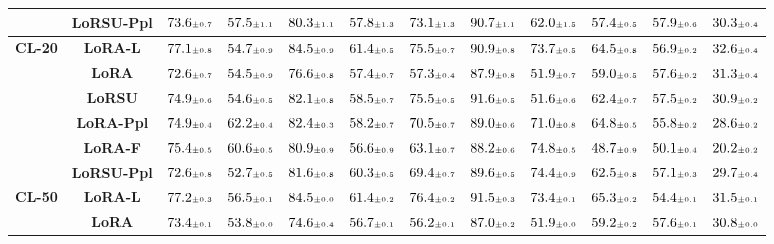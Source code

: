 \begin{table}
\begin{center}
\begin{small}
\begin{tabular}{l c c c c c c c c c c c}
& \textbf{LoRSU-Ppl} & $73.6 \mtiny{\pm 0.7}$ & $57.5 \mtiny{\pm 1.1}$ & $80.3 \mtiny{\pm 1.1}$ & $57.8 \mtiny{\pm 1.3}$ & $73.1 \mtiny{\pm 1.3}$ & $90.7 \mtiny{\pm 1.1}$ & $62.0 \mtiny{\pm 1.5}$ & $57.4 \mtiny{\pm 0.5}$ & $57.9 \mtiny{\pm 0.6}$ & $30.3 \mtiny{\pm 0.4}$ \\
\midrule
\multirow{6}{*}{\textbf{CL-20}} & \textbf{LoRA-L} & $77.1 \mtiny{\pm 0.8}$ & $54.7 \mtiny{\pm 0.9}$ & $84.5 \mtiny{\pm 0.9}$ & $61.4 \mtiny{\pm 0.5}$ & $75.5 \mtiny{\pm 0.7}$ & $90.9 \mtiny{\pm 0.8}$ & $73.7 \mtiny{\pm 0.5}$ & $64.5 \mtiny{\pm 0.8}$ & $56.9 \mtiny{\pm 0.2}$ & $32.6 \mtiny{\pm 0.4}$ \\
& \textbf{LoRA} & $72.6 \mtiny{\pm 0.7}$ & $54.5 \mtiny{\pm 0.9}$ & $76.6 \mtiny{\pm 0.8}$ & $57.4 \mtiny{\pm 0.7}$ & $57.3 \mtiny{\pm 0.4}$ & $87.9 \mtiny{\pm 0.8}$ & $51.9 \mtiny{\pm 0.7}$ & $59.0 \mtiny{\pm 0.5}$ & $57.6 \mtiny{\pm 0.2}$ & $31.3 \mtiny{\pm 0.4}$ \\
& \textbf{LoRSU} & $74.9 \mtiny{\pm 0.6}$ & $54.6 \mtiny{\pm 0.5}$ & $82.1 \mtiny{\pm 0.8}$ & $58.5 \mtiny{\pm 0.7}$ & $75.5 \mtiny{\pm 0.5}$ & $91.6 \mtiny{\pm 0.5}$ & $51.6 \mtiny{\pm 0.6}$ & $62.4 \mtiny{\pm 0.7}$ & $57.5 \mtiny{\pm 0.2}$ & $30.9 \mtiny{\pm 0.2}$ \\
& \textbf{LoRA-Ppl} & $74.9 \mtiny{\pm 0.4}$ & $62.2 \mtiny{\pm 0.4}$ & $82.4 \mtiny{\pm 0.3}$ & $58.2 \mtiny{\pm 0.7}$ & $70.5 \mtiny{\pm 0.7}$ & $89.0 \mtiny{\pm 0.6}$ & $71.0 \mtiny{\pm 0.8}$ & $64.8 \mtiny{\pm 0.5}$ & $55.8 \mtiny{\pm 0.2}$ & $28.6 \mtiny{\pm 0.2}$ \\
& \textbf{LoRA-F} & $75.4 \mtiny{\pm 0.5}$ & $60.6 \mtiny{\pm 0.5}$ & $80.9 \mtiny{\pm 0.9}$ & $56.6 \mtiny{\pm 0.9}$ & $63.1 \mtiny{\pm 0.7}$ & $88.2 \mtiny{\pm 0.6}$ & $74.8 \mtiny{\pm 0.5}$ & $48.7 \mtiny{\pm 0.9}$ & $50.1 \mtiny{\pm 0.4}$ & $20.2 \mtiny{\pm 0.2}$ \\
& \textbf{LoRSU-Ppl} & $72.6 \mtiny{\pm 0.8}$ & $52.7 \mtiny{\pm 0.5}$ & $81.6 \mtiny{\pm 0.8}$ & $60.3 \mtiny{\pm 0.5}$ & $69.4 \mtiny{\pm 0.7}$ & $89.6 \mtiny{\pm 0.5}$ & $74.4 \mtiny{\pm 0.9}$ & $62.5 \mtiny{\pm 0.8}$ & $57.1 \mtiny{\pm 0.3}$ & $29.7 \mtiny{\pm 0.4}$ \\
\midrule
\multirow{6}{*}{\textbf{CL-50}} & \textbf{LoRA-L} & $77.2 \mtiny{\pm 0.3}$ & $56.5 \mtiny{\pm 0.1}$ & $84.5 \mtiny{\pm 0.0}$ & $61.4 \mtiny{\pm 0.2}$ & $76.4 \mtiny{\pm 0.2}$ & $91.5 \mtiny{\pm 0.3}$ & $73.4 \mtiny{\pm 0.1}$ & $65.3 \mtiny{\pm 0.2}$ & $54.4 \mtiny{\pm 0.1}$ & $31.5 \mtiny{\pm 0.1}$ \\
& \textbf{LoRA} & $73.4 \mtiny{\pm 0.1}$ & $53.8 \mtiny{\pm 0.0}$ & $74.6 \mtiny{\pm 0.4}$ & $56.7 \mtiny{\pm 0.1}$ & $56.2 \mtiny{\pm 0.1}$ & $87.0 \mtiny{\pm 0.2}$ & $51.9 \mtiny{\pm 0.0}$ & $59.2 \mtiny{\pm 0.2}$ & $57.6 \mtiny{\pm 0.1}$ & $30.8 \mtiny{\pm 0.0}$ \\

\end{tabular}
\end{small}
\end{center}
\end{table}
